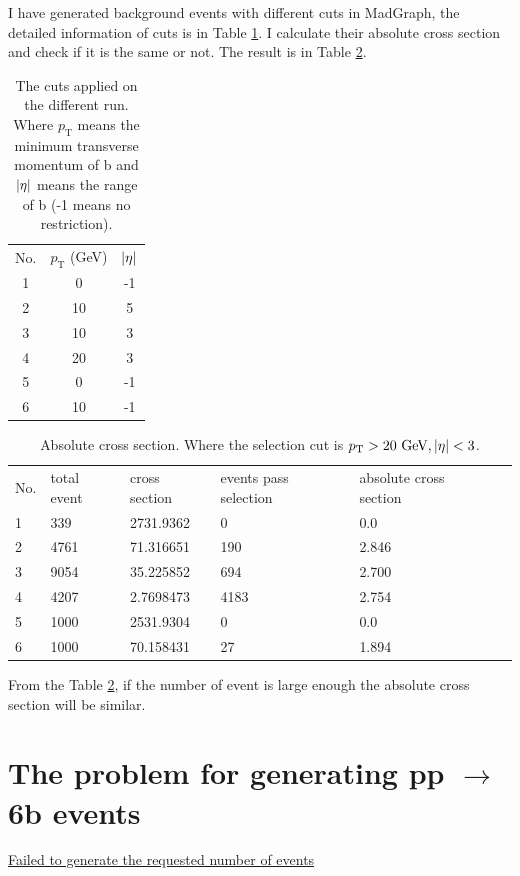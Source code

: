 \documentclass[12pt]{article}
\begin{document}
	I have generated background events with different cuts in MadGraph, the detailed information of cuts is in Table \ref{tab:cut_of_different_run}. I calculate their absolute cross section and check if it is the same or not. The result is in Table \ref{tab:absolute_cross_section}.

	\begin{table}[htpb]
		\centering
		\caption{The cuts applied on the different run. Where $p_\text{T}$ means the minimum transverse momentum of b and $\abs{\eta}$ means the range of b (-1 means no restriction).}
		\label{tab:cut_of_different_run}
		\begin{tabular}{ccc}
			No.& $p_\text{T}$ (GeV) & $\abs{\eta}$  \\
			1 &      0       &           -1      \\
			2 &      10       &     5          \\
			3 &      10       &     3 \\
			4 &      20       &     3 \\
			5 &      0       &     -1 \\
			6 &      10       &     -1 
		\end{tabular}	
	\end{table}


	\begin{table}[htpb]
		\centering
		\caption{Absolute cross section. Where the selection cut is $p_\text{T}> \text{20 GeV}, \abs{\eta} < 3$.}
		\label{tab:absolute_cross_section}
		\begin{tabular}{llllll}
			No.& total event & cross section & events pass selection   & absolute cross section \\
			1& 339 & 2731.9362 & 0 & 0.0    \\
			2& 4761 & 71.316651 & 190 & 2.846   \\
			3& 9054 & 35.225852 & 694 & 2.700 \\
			4& 4207 & 2.7698473 & 4183 & 2.754 \\
			5& 1000 & 2531.9304 & 0 & 0.0 \\
			6& 1000 & 70.158431 & 27 & 1.894
		\end{tabular}	
	\end{table}

	From the Table \ref{tab:absolute_cross_section}, if the number of event is large enough the absolute cross section will be similar.
\section{The problem for generating \texorpdfstring{pp $\to$ 6b}{pp to 6b} events}%
\label{sec:the_problem_for_generating_pp_6b_events}
	\href{https://answers.launchpad.net/mg5amcnlo/+question/701314}{Failed to generate the requested number of events}
\end{document}
